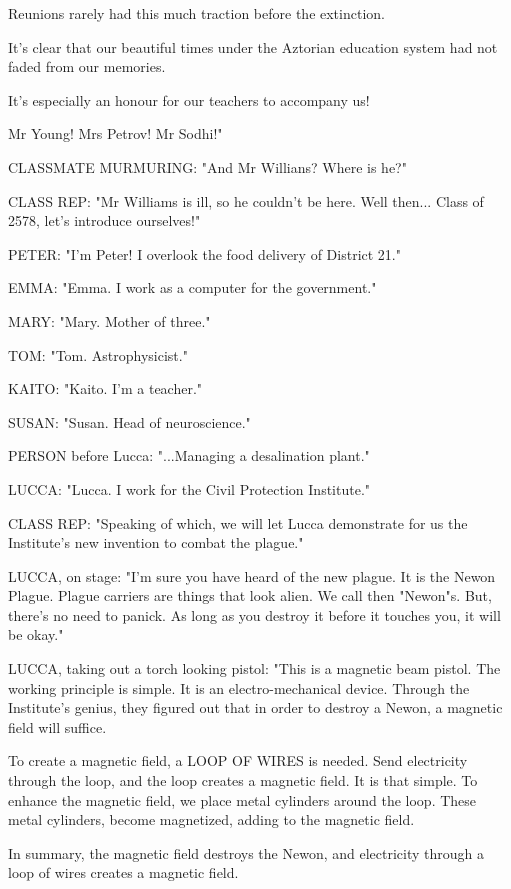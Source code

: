 \documentclass[11pt]{article}
\begin{document}
Reunions rarely had this much traction before the extinction.

It's clear that our beautiful times under the Aztorian education system had not faded from our memories.

It's especially an honour for our teachers to accompany us!

Mr Young!
Mrs Petrov!
Mr Sodhi!"

CLASSMATE MURMURING: "And Mr Willians? Where is he?"

CLASS REP: "Mr Williams is ill, so he couldn't be here. Well then...
Class of 2578, let's introduce ourselves!"

PETER: "I'm Peter! I overlook the food delivery of District 21."

EMMA: "Emma. I work as a computer for the government."

MARY: "Mary. Mother of three."

TOM: "Tom. Astrophysicist."

KAITO: "Kaito. I'm a teacher."

SUSAN: "Susan. Head of neuroscience."

PERSON before Lucca: "...Managing a desalination plant."

LUCCA: "Lucca. I work for the Civil Protection Institute."

CLASS REP: "Speaking of which, we will let Lucca demonstrate for us the Institute's new invention to combat the plague."

LUCCA, on stage: "I'm sure you have heard of the new plague. 
It is the Newon Plague.
Plague carriers are things that look alien. 
We call then "Newon"s.
But, there's no need to panick.
As long as you destroy it before it touches you, it will be okay."

LUCCA, taking out a torch looking pistol: "This is a magnetic beam pistol.
The working principle is simple.
It is an electro-mechanical device.
Through the Institute's genius, they figured out that in order to destroy a Newon, a magnetic field will suffice.

To create a magnetic field, a LOOP OF WIRES is needed. 
Send electricity through the loop, and the loop creates a magnetic field.
It is that simple.
To enhance the magnetic field, we place metal cylinders around the loop.
These metal cylinders, become magnetized, adding to the magnetic field.

In summary, the magnetic field destroys the Newon, and electricity through a loop of wires creates a magnetic field.
\end{document}
